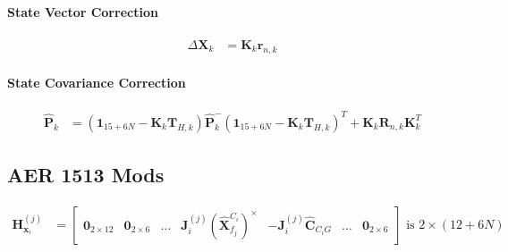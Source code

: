 \documentclass[10pt,letterpaper,fleqn,oneside]{article}
\def\Vec#1{\mathbf{#1}} %
\newcommand{\bbm}{\begin{bmatrix}}
\newcommand{\ebm}{\end{bmatrix}}
\begin{document}
\paragraph{State Vector Correction}
\begin{align}
\Delta\Vec{X}_k &= \Vec{K}_k\Vec{r}_{n,k}
\end{align}

\paragraph{State Covariance Correction}
\begin{align}
\hat{\Vec{P}}_k &= \left(\Vec{1}_{15+6N} - \Vec{K}_k\Vec{T}_{H,k} \right)\hat{\Vec{P}}^-_k\left(\Vec{1}_{15+6N} - \Vec{K}_k\Vec{T}_{H,k} \right)^T + \Vec{K}_k\Vec{R}_{n,k}\Vec{K}_k^T
\end{align}

\subsection{AER 1513 Mods}
\begin{align}
\Vec{H}^{(j)}_{\Vec{x}_i} &= \bbm \Vec{0}_{2\times12} & \Vec{0}_{2\times6} & \hdots & \Vec{J}^{\left(j\right)}_i \left(\hat{\Vec{X}}^{C_i}_{f_j}\right)^\times & -\Vec{J}^{\left(j\right)}_i \hat{\Vec{C}}_{C_i G} & \hdots & \Vec{0}_{2\times6} \ebm \text{ is } 2\times\left(12 + 6N\right)
\end{align}


%
%

\end{document}
